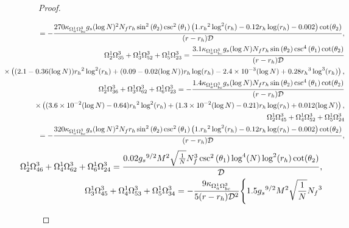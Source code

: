 \documentclass[a4paper,11pt,fleqn]{article}
\theoremstyle{plain}
\theoremstyle{definition}
\begin{document}
\begin{proof}
\begin{itemize}
{\begin{eqnarray*}
 & &  \hskip -0.8in {\scriptsize = -\frac{{270\kappa_{\Omega^1_a\Omega^3_{bc}} } {g_s}
    (\log N) ^2  N_f  {r_h} \sin ^2\left(\theta_2\right) \csc
   ^2\left(\theta_1\right) \left(1. {r_h}^2 \log
   ^2({r_h})-0.12 {r_h} \log ({r_h})-0.002\right)
   \cot (\theta_2)}{(r-{r_h}) {\cal D}},}\nonumber\\
& &  \hskip -0.8in \Omega^1_2\Omega^3_{35} + \Omega^1_3\Omega^3_{52} + 
 \Omega^1_5\Omega^3_{23}  =    \frac{3.1 \kappa_{\Omega^1_a\Omega^3_{bc}} {g_s}  (\log N)   N_f  {r_h} \sin
   \left(\theta_2\right) \csc ^4\left(\theta_1\right) \cot
   (\theta_2)}{(r-{r_h}) {\cal D}}\nonumber\\
& & \hskip -0.8in \times  \left(({2.1}-{0.36}  (\log N) ) {r_h}^2 \log
   ^2({r_h})+({0.09}-{0.02}  (\log N) ) {r_h} \log
   ({r_h})-{2.4\times10^{-3}}
    (\log N) +{0.28}
   {r_h}^3 \log ^3({r_h})\right),\nonumber\\
& &  \hskip -0.8in \Omega^1_2\Omega^3_{36} + \Omega^1_3 \Omega^3_{62} + 
 \Omega^1_6\Omega^3_{23} = -\frac{1.4 \kappa_{\Omega^1_a\Omega^3_{bc}}  {g_s}  (\log N)   N_f  {r_h} \sin \left(\theta
   _2\right) \csc ^4\left(\theta_1\right) \cot (\theta_2)
   }{(r-{r_h}) {\cal D}}\nonumber\\
& & \hskip -0.8in \times \left(({3.6\times10^{-2}}
    (\log N) -{0.64}) {r_h}^2 \log
   ^2({r_h})+({1.3\times10^{-2}}
    (\log N) -{0.21}) {r_h} \log
   ({r_h})+{0.012}
    (\log N) \right),\nonumber\\
 & &  \hskip -0.8in \Omega^1_2\Omega^3_{45} + \Omega^1_4\Omega^3_{52} + 
 \Omega^1_5\Omega^3_{24}\nonumber\\
& &  \hskip -0.8in = -\frac{{320\kappa_{\Omega^1_a\Omega^3_{bc}} } {g_s}  (\log N) ^2
    N_f  {r_h} \sin ^2\left(\theta_2\right) \csc ^2\left(\theta
   _1\right) \left(1. {r_h}^2 \log ^2({r_h})-0.12 {r_h} \log
   ({r_h})-0.002\right) \cot (\theta_2)}{(r-{r_h}) {\cal D}},\nonumber\\
\end{eqnarray*}
\begin{eqnarray} 
\label{Omega1aOmega3bc}  
   & &  \hskip -0.8in \Omega^1_2\Omega^3_{46} + \Omega^1_4\Omega^3_{62} + 
 \Omega^1_6\Omega^3_{24} = \frac{0.02 {g_s}^{9/2} M^2 \sqrt{\frac{1}{N}}  N_f ^3 \csc
   ^2\left(\theta_1\right) \log ^4(N) \log ^2({r_h}) \cot
   (\theta_2)}{{\cal D}},\nonumber\\
 & &  \hskip -0.8in \Omega^1_3\Omega^3_{45} + \Omega^1_4\Omega^3_{53} + 
 \Omega^1_5\Omega^3_{34} =   -\frac{9\kappa_{\Omega^1_a\Omega^3_{bc}} }{5(r-{r_h})
   {\cal D}^2}\Biggl\{1.5 {g_s}^{9/2} M^2 \sqrt{\frac{1}{N}} {N_f}^3

\end{eqnarray}}
\end{itemize}
\end{proof}
\end{document}
